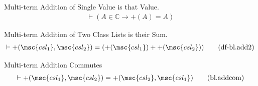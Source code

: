 

%

%



\begin{metadefinition} {Multi-term Addition of Single Value
is that Value.}
\begin{align}
\vdash ( A \in \mathbb{C} \rightarrow +( A ) = A
    )\label{eq:df-bl.add1}\tag{df-bl.add1}
\end{align}
\end{metadefinition}


\begin{metadefinition} {Multi-term Addition of Two Class
Lists is their Sum.}
\begin{align}
\vdash +( \msc{csl_1} , \msc{csl_2} ) = ( +( \msc{csl_1} ) + +( \msc{csl_2} )
    )\label{eq:df-bl.add2}\tag{df-bl.add2}
\end{align}
\end{metadefinition}


\begin{lemma} {Multi-term Addition Commutes}
\begin{align}
\vdash +( \msc{csl_1} , \msc{csl_2} ) = +( \msc{csl_2} , \msc{csl_1}
    )\label{eq:bl.addcom}\tag{bl.addcom}
\end{align}
\end{lemma}


